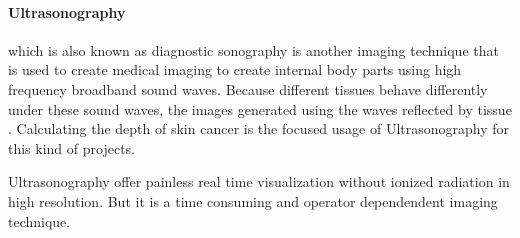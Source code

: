             

        \paragraph{Ultrasonography} which is also known as diagnostic sonography is another imaging technique that is used to create medical imaging to create internal body parts using high frequency broadband sound waves.
            Because different tissues behave differently under these sound waves,  the images generated using the waves reflected by tissue \cite{sahuquillo2013study}.
            Calculating the depth of skin cancer is the focused usage of Ultrasonography for this kind of projects.

            Ultrasonography offer painless real time visualization without ionized radiation in high resolution.
            But it is a time consuming and operator dependendent imaging technique.
